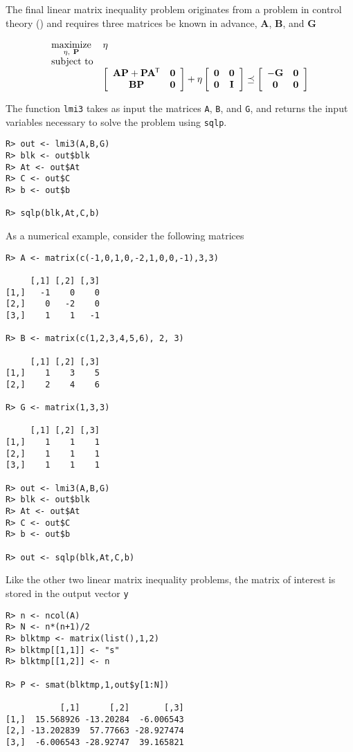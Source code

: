 \documentclass{article}
\newcommand{\m}[1]{\mathbf{#1}}               %
\newcommand{\tr}[1]{{#1}^{\mkern-1.5mu\mathsf{T}}}              %
\begin{document}
The final linear matrix inequality problem originates from a problem in control theory (\cite{boyd1994linear}) and requires three matrices be known in advance, $\m{A}$, $\m{B}$, and $\m{G}$

\[
\begin{array}{ll}
\underset{\eta,~\m{P}}{\text{maximize}} & \eta \\
\text{subject to} & \\
 & \left[\begin{array}{cc}
\m{A}\m{P} + \m{P}\tr{\m{A}} & \m{0} \\
\m{B}\m{P} & \m{0}
\end{array} \right]
+ \eta
\left[\begin{array}{cc}
\m{0} & \m{0} \\
\m{0} & \m{I}
\end{array} \right]
\preceq
\left[\begin{array}{cc}
-\m{G} & \m{0} \\
\m{0} & \m{0}
\end{array} \right]
\end{array}
\]

The function \verb!lmi3! takes as input the matrices \verb!A!, \verb!B!, and \verb!G!, and returns the input variables necessary to solve the problem using \verb!sqlp!.

\begin{verbatim}
R> out <- lmi3(A,B,G)
R> blk <- out$blk
R> At <- out$At
R> C <- out$C
R> b <- out$b

R> sqlp(blk,At,C,b)
\end{verbatim}

As a numerical example, consider the following matrices

\begin{verbatim}
R> A <- matrix(c(-1,0,1,0,-2,1,0,0,-1),3,3)

     [,1] [,2] [,3]
[1,]   -1    0    0
[2,]    0   -2    0
[3,]    1    1   -1

R> B <- matrix(c(1,2,3,4,5,6), 2, 3)

     [,1] [,2] [,3]
[1,]    1    3    5
[2,]    2    4    6

R> G <- matrix(1,3,3)

     [,1] [,2] [,3]
[1,]    1    1    1
[2,]    1    1    1
[3,]    1    1    1

R> out <- lmi3(A,B,G)
R> blk <- out$blk
R> At <- out$At
R> C <- out$C
R> b <- out$b

R> out <- sqlp(blk,At,C,b)
\end{verbatim}

Like the other two linear matrix inequality problems, the matrix of interest is stored in the output vector \verb!y!

\begin{verbatim}
R> n <- ncol(A)
R> N <- n*(n+1)/2
R> blktmp <- matrix(list(),1,2)
R> blktmp[[1,1]] <- "s"
R> blktmp[[1,2]] <- n

R> P <- smat(blktmp,1,out$y[1:N])

           [,1]      [,2]       [,3]
[1,]  15.568926 -13.20284  -6.006543
[2,] -13.202839  57.77663 -28.927474
[3,]  -6.006543 -28.92747  39.165821
\end{verbatim}



\end{document}
